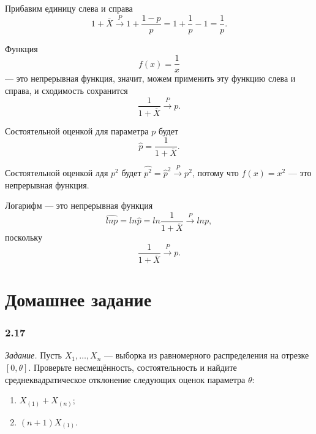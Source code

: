 Прибавим единицу слева и справа
$$1 + \overline{X} \overset{P}{ \to }
  1 + \frac{1 - p}{p} =
  1 + \frac{1}{p} - 1 =
  \frac{1}{p}.$$

Функция
$$f \left( x \right) =
  \frac{1}{x}$$
--- это непрерывная функция, значит, можем применить эту функцию слева и справа,
и сходимость сохранится
$$ \frac{1}{1 + \overline{X}} \overset{P}{ \to }
  p.$$

Состоятельной оценкой для параметра $p$ будет
$$ \hat{p} =
  \frac{1}{1 + \overline{X}}.$$

Состоятельной оценкой лдя $p^2$ будет $ \hat{p^2} = \hat{p}^2 \overset{P}{ \to } p^2$,
потому что $f \left( x \right) = x^2$ --- это непрерывная функция.

Логарифм --- это непрерывная функция
$$ \hat{ln p} =
  ln \hat{p} =
  ln \frac{1}{1 + \overline{X}} \overset{P}{ \to }
  ln p,$$
поскольку
$$ \frac{1}{1 + \overline{X}} \overset{P}{ \to }
  p.$$

\section*{Домашнее задание}

\subsubsection*{2.17}

\textit{Задание.}
Пусть $X_1, \dotsc, X_n$ ---
выборка из равномерного распределения на отрезке $ \left[ 0, \theta \right] $.
Проверьте несмещённость,
состоятельность и найдите среднеквадратическое отклонение следующих оценок параметра $ \theta $:
\begin{enumerate}[label=\alph*)]
  \item $X_{ \left( 1 \right) } + X_{ \left( n \right) }$;
  \item $ \left( n + 1 \right) X_{ \left( 1 \right) }$.
\end{enumerate}

